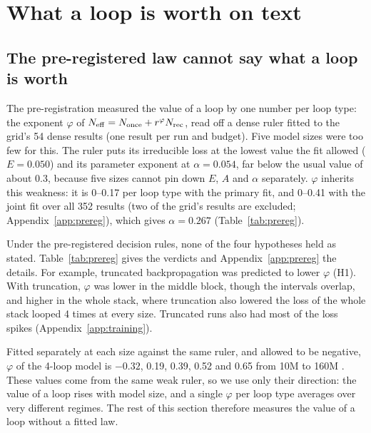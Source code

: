 \section{What a loop is worth on text}
\label{sec:text}

\subsection{The pre-registered law cannot say what a loop is worth}
\label{sec:verdicts}

The pre-registration measured the value of a loop by one number per loop type: the exponent $\varphi$ of
$N_{\mathrm{eff}} = N_{\mathrm{once}} + r^{\varphi}N_{\mathrm{rec}}$, read off a dense ruler fitted to the grid's 54 dense results (one result per run
and budget). Five model sizes were
too few for this. The ruler puts its irreducible loss at the lowest value the fit allowed ($E = 0.050$) and its parameter
exponent at $\alpha = 0.054$, far below the usual value of about 0.3, because five sizes cannot pin down $E$, $A$ and
$\alpha$ separately. $\varphi$ inherits this weakness: it is 0--0.17 per loop type with the primary fit, and 0--0.41 with the joint fit over all 352 results (two of the grid's results are excluded;
Appendix~\ref{app:prereg}), which gives $\alpha = 0.267$ (Table~\ref{tab:prereg}).

Under the pre-registered decision rules, none of the four hypotheses held as stated. Table~\ref{tab:prereg} gives the verdicts and
Appendix~\ref{app:prereg} the details. For example, truncated backpropagation was predicted to lower $\varphi$ (H1). With truncation, $\varphi$ was lower in the middle block, though the intervals
overlap, and higher in the whole stack, where truncation also lowered the loss of the whole stack looped 4 times at every size.
Truncated runs also had most of the loss spikes (Appendix~\ref{app:training}).

Fitted separately at each size against the same ruler, and allowed to be negative, $\varphi$ of the 4-loop model is
$-0.32$, 0.19, 0.39, 0.52 and 0.65 from 10M to 160M . These values come from the same weak ruler, so we use only their direction: the value of a
loop rises with model size, and a single $\varphi$ per loop type averages over very different regimes. The rest of this
section therefore measures the value of a loop without a fitted law.

